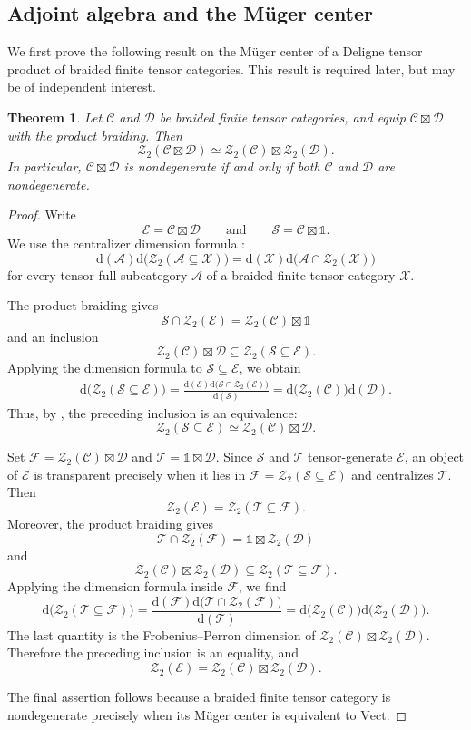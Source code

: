 \documentclass[11pt,reqno]{amsart}
\numberwithin{equation}{section}
\theoremstyle{plain}
\newtheorem{theorem}[thmctr]{Theorem}
\theoremstyle{definition}
\theoremstyle{remark}
\newcommand{\unit}{\mathds{1}}
\newcommand{\cA}{\mathcal{A}}
\newcommand{\C}{\mathcal{C}}
\newcommand{\D}{\mathcal{D}}
\newcommand{\E}{\mathcal{E}}
\newcommand{\F}{\mathcal{F}}
\newcommand{\Z}{\mathcal{Z}}
\newcommand{\T}{\mathcal{T}}
\newcommand{\cS}{\mathcal{S}}
\newcommand{\FP}{\mathrm{d}}
\newcommand{\Vect}{\mathrm{Vect}}
\begin{document}
\subsection{Adjoint algebra and the M\"uger center}
We first prove the following result on the M\"uger center of a Deligne tensor product of braided finite tensor categories. This result is required later, but may be of independent interest.

\begin{theorem}\label{thm:muger-center-deligne-product}
Let $\C$ and $\D$ be braided finite tensor categories, and
equip $\C\boxtimes\D$ with the product braiding. Then
\[
\Z_2(\C\boxtimes\D)
\simeq
\Z_2(\C)\boxtimes\Z_2(\D).
\]
In particular, $\C\boxtimes\D$ is nondegenerate if and only if
both $\C$ and $\D$ are nondegenerate.
\end{theorem}

\begin{proof}
Write
\[
\E=\C\boxtimes\D
\qquad\text{and}\qquad
\cS=\C\boxtimes\unit.
\]
We use the centralizer dimension formula
\cite[Theorem~4.9]{shimizu2019non}:
\[
\FP(\cA)
\FP\bigl(\Z_2(\cA\subseteq\mathcal X)\bigr)
=
\FP(\mathcal X)
\FP\bigl(\cA\cap\Z_2(\mathcal X)\bigr)
\]
for every tensor full subcategory $\cA$ of a braided finite tensor
category $\mathcal X$.

The product braiding gives
\[
\cS\cap\Z_2(\E)
=
\Z_2(\C)\boxtimes\unit
\]
and an inclusion
\[
\Z_2(\C)\boxtimes\D
\subseteq
\Z_2(\cS\subseteq\E).
\]
Applying the dimension formula to $\cS\subseteq\E$, we obtain
\[
\begin{aligned}
\FP\bigl(\Z_2(\cS\subseteq\E)\bigr)
=
\frac{
 \FP(\E)
 \FP\bigl(\cS\cap\Z_2(\E)\bigr)
}{
 \FP(\cS)
} 
=
\FP\bigl(\Z_2(\C)\bigr)
\FP(\D).
\end{aligned}
\]
Thus, by \cite[Proposition~6.3.3]{etingof2016tensor}, the preceding inclusion is an equivalence:
\[
  \Z_2(\cS\subseteq\E)\simeq\Z_2(\C)\boxtimes\D.
\]

Set $\F = \Z_2(\C)\boxtimes\D$ and $\T=\unit\boxtimes\D$. 
Since $\cS$ and $\T$ tensor-generate $\E$, an object of
$\E$ is transparent precisely when it lies in
$\F=\Z_2(\cS\subseteq\E)$ and centralizes $\T$. Then
\[
\Z_2(\E) = \Z_2(\T\subseteq\F).
\]
Moreover, the product braiding gives
\[
\T\cap\Z_2(\F)
=
\unit\boxtimes\Z_2(\D)
\]
and
\[
\Z_2(\C)\boxtimes\Z_2(\D)
\subseteq
\Z_2(\T\subseteq\F).
\]
Applying the dimension formula inside $\F$, we find
\begin{equation*}
\FP\bigl(\Z_2(\T\subseteq\F)\bigr)
=
\frac{
  \FP(\F)\FP\bigl(\T\cap\Z_2(\F)\bigr)
}{
  \FP(\T)
}
= \FP\bigl(\Z_2(\C)\bigr) \FP\bigl(\Z_2(\D)\bigr).
\end{equation*}
The last quantity is the Frobenius--Perron dimension of
$\Z_2(\C)\boxtimes\Z_2(\D)$. Therefore the
preceding inclusion is an equality, and
\[
\Z_2(\E)
=
\Z_2(\C)\boxtimes\Z_2(\D).
\]

The final assertion follows because a braided finite tensor category is
nondegenerate precisely when its M\"uger center is equivalent to $\Vect$.
\end{proof}
\end{document}
